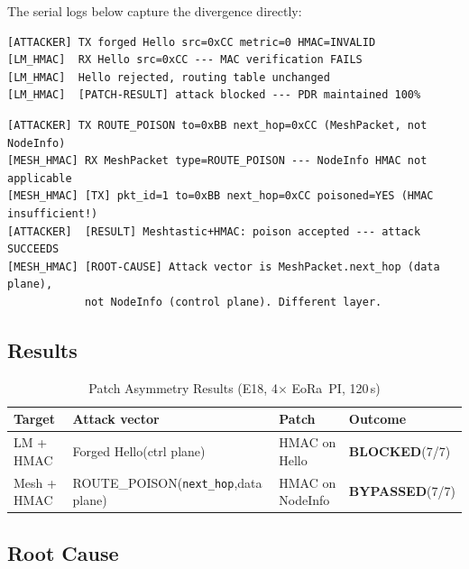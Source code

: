 \documentclass[journal]{IEEEtran}
\begin{document}
The serial logs below capture the divergence directly:

\begin{lstlisting}[caption={E18 serial log --- LoRaMesher + HMAC (attack BLOCKED)}]
[ATTACKER] TX forged Hello src=0xCC metric=0 HMAC=INVALID
[LM_HMAC]  RX Hello src=0xCC --- MAC verification FAILS
[LM_HMAC]  Hello rejected, routing table unchanged
[LM_HMAC]  [PATCH-RESULT] attack blocked --- PDR maintained 100%
\end{lstlisting}

\begin{lstlisting}[caption={E18 serial log --- Meshtastic + NodeInfo HMAC (attack SUCCEEDS)}]
[ATTACKER] TX ROUTE_POISON to=0xBB next_hop=0xCC (MeshPacket, not NodeInfo)
[MESH_HMAC] RX MeshPacket type=ROUTE_POISON --- NodeInfo HMAC not applicable
[MESH_HMAC] [TX] pkt_id=1 to=0xBB next_hop=0xCC poisoned=YES (HMAC insufficient!)
[ATTACKER]  [RESULT] Meshtastic+HMAC: poison accepted --- attack SUCCEEDS
[MESH_HMAC] [ROOT-CAUSE] Attack vector is MeshPacket.next_hop (data plane),
            not NodeInfo (control plane). Different layer.
\end{lstlisting}

\subsection{Results}

\begin{table}[h]
  \centering
  \caption{Patch Asymmetry Results (E18, 4$\times$ EoRa~PI, 120\,s)}
  \label{tab:e18}
  \footnotesize
  \begin{tabular}{@{}p{1.7cm}p{2.2cm}p{1.6cm}p{1.5cm}@{}}
    \toprule
    Target & Attack vector & Patch & Outcome \\
    \midrule
    LM + HMAC & Forged Hello\newline(ctrl plane) & HMAC on Hello & \textbf{BLOCKED}\newline(7/7) \\
    Mesh + HMAC & ROUTE\_POISON\newline(\texttt{next\_hop},\newline data plane) & HMAC on NodeInfo & \textbf{BYPASSED}\newline(7/7) \\
    \bottomrule
  \end{tabular}
\end{table}

\subsection{Root Cause}
\end{document}
